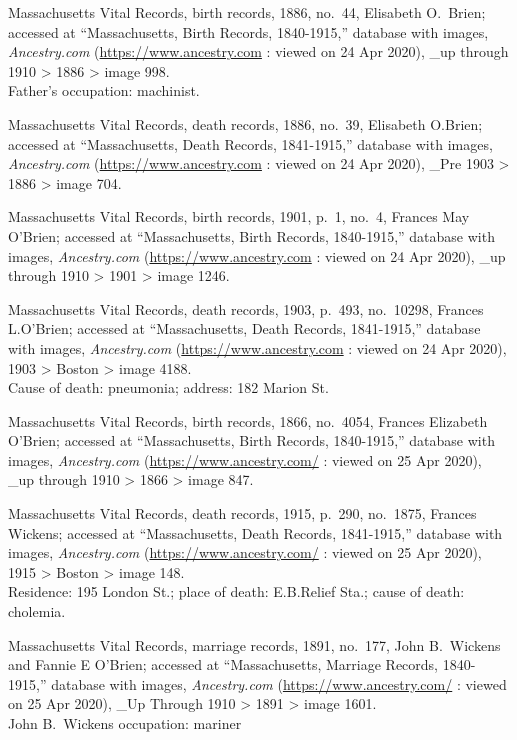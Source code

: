\begin{thebibliography}{999}
	Massachusetts Vital Records, birth records, 1886, no.\ 44, Elisabeth O.\ Brien; accessed at ``Massachusetts, Birth Records, 1840-1915,'' database with images, \textit{Ancestry.com} (\url{https://www.ancestry.com} : viewed on 24 Apr 2020), \_up through 1910 > 1886 > image 998.\\
	Father's occupation: machinist.
	
	Massachusetts Vital Records, death records, 1886, no.\ 39, Elisabeth O.Brien; accessed at ``Massachusetts, Death Records, 1841-1915,'' database with images, \textit{Ancestry.com} (\url{https://www.ancestry.com} : viewed on 24 Apr 2020), \_Pre 1903 > 1886 > image 704.	
	
	Massachusetts Vital Records, birth records, 1901, p.\ 1, no.\ 4, Frances May O'Brien; accessed at ``Massachusetts, Birth Records, 1840-1915,'' database with images, \textit{Ancestry.com} (\url{https://www.ancestry.com} : viewed on 24 Apr 2020), \_up through 1910 > 1901 > image 1246.
	
	Massachusetts Vital Records, death records, 1903, p.\ 493, no.\ 10298, Frances L.O'Brien; accessed at ``Massachusetts, Death Records, 1841-1915,'' database with images, \textit{Ancestry.com} (\url{https://www.ancestry.com} : viewed on 24 Apr 2020), 1903 > Boston > image 4188.\\
	Cause of death: pneumonia; address: 182 Marion St.
	
	Massachusetts Vital Records, birth records, 1866, no.\ 4054, Frances Elizabeth O'Brien; accessed at ``Massachusetts, Birth Records, 1840-1915,'' database with images, \textit{Ancestry.com} (\url{https://www.ancestry.com/} : viewed on 25 Apr 2020), \_up through 1910 > 1866 > image 847.
	
	Massachusetts Vital Records, death records, 1915, p.\ 290, no.\ 1875, Frances Wickens; accessed at ``Massachusetts, Death Records, 1841-1915,'' database with images, \textit{Ancestry.com} (\url{https://www.ancestry.com/} : viewed on 25 Apr 2020), 1915 > Boston > image 148.\\
	Residence: 195 London St.; place of death: E.B.Relief Sta.; cause of death: cholemia.
	
	Massachusetts Vital Records, marriage records, 1891, no.\ 177, John B.\ Wickens and Fannie E O'Brien; accessed at ``Massachusetts, Marriage Records, 1840-1915,'' database with images, \textit{Ancestry.com} (\url{https://www.ancestry.com/} : viewed on 25 Apr 2020), \_Up Through 1910 > 1891 > image 1601.\\
	John B.\ Wickens occupation: mariner
	

\end{thebibliography}
